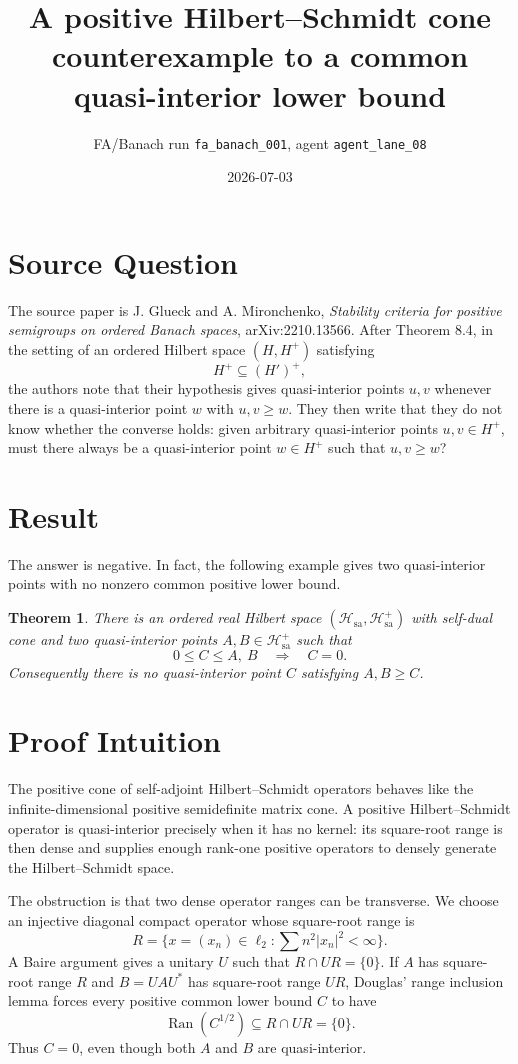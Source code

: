 \documentclass[11pt]{article}
\title{A positive Hilbert--Schmidt cone counterexample to a common quasi-interior lower bound}
\author{FA/Banach run \texttt{fa\_banach\_001}, agent \texttt{agent\_lane\_08}}
\date{2026-07-03}
\newtheorem{theorem}{Theorem}
\DeclareMathOperator{\Ran}{Ran}
\newcommand{\Hsa}{\mathcal H_{\mathrm{sa}}}
\begin{document}
\maketitle

\section*{Source Question}

The source paper is J. Glueck and A. Mironchenko, \emph{Stability criteria for positive semigroups on ordered Banach spaces}, arXiv:2210.13566.  After Theorem 8.4, in the setting of an ordered Hilbert space $(H,H^+)$ satisfying
\[
        H^+ \subseteq (H')^+,
\]
the authors note that their hypothesis gives quasi-interior points $u,v$ whenever there is a quasi-interior point $w$ with $u,v\geq w$.  They then write that they do not know whether the converse holds: given arbitrary quasi-interior points $u,v\in H^+$, must there always be a quasi-interior point $w\in H^+$ such that $u,v\geq w$?

\section*{Result}

The answer is negative.  In fact, the following example gives two quasi-interior points with no nonzero common positive lower bound.

\begin{theorem}
There is an ordered real Hilbert space $(\Hsa,\Hsa^+)$ with self-dual cone and two quasi-interior points $A,B\in\Hsa^+$ such that
\[
        0\leq C\leq A,\ B
        \quad\Longrightarrow\quad
        C=0.
\]
Consequently there is no quasi-interior point $C$ satisfying $A,B\geq C$.
\end{theorem}

\section*{Proof Intuition}

The positive cone of self-adjoint Hilbert--Schmidt operators behaves like the infinite-dimensional positive semidefinite matrix cone.  A positive Hilbert--Schmidt operator is quasi-interior precisely when it has no kernel: its square-root range is then dense and supplies enough rank-one positive operators to densely generate the Hilbert--Schmidt space.

The obstruction is that two dense operator ranges can be transverse.  We choose an injective diagonal compact operator whose square-root range is
\[
        R=\{x=(x_n)\in\ell_2:\sum n^2 |x_n|^2<\infty\}.
\]
A Baire argument gives a unitary $U$ such that $R\cap U R=\{0\}$.  If $A$ has square-root range $R$ and $B=UAU^*$ has square-root range $UR$, Douglas' range inclusion lemma forces every positive common lower bound $C$ to have
\[
        \Ran(C^{1/2})\subseteq R\cap U R=\{0\}.
\]
Thus $C=0$, even though both $A$ and $B$ are quasi-interior.
\end{document}
